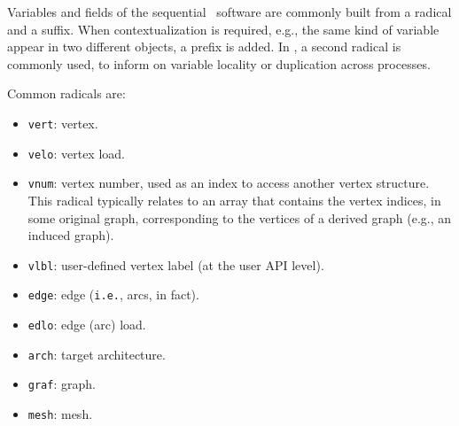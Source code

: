 Variables and fields of the sequential \scotch\ software are commonly
built from a radical and a suffix. When contextualization is required,
e.g., the same kind of variable appear in two different objects, a
prefix is added. In \ptscotch, a second radical is commonly used, to
inform on variable locality or duplication across processes.

Common radicals are:
\begin{itemize}
\item
\texttt{vert}: vertex.
\item
\texttt{velo}: vertex load.
\item
\texttt{vnum}: vertex number, used as an index to access another vertex
structure. This radical typically relates to an array that contains
the vertex indices, in some original graph, corresponding to the
vertices of a derived graph (e.g., an induced graph).
\item
\texttt{vlbl}: user-defined vertex label (at the user API level).
\item
\texttt{edge}: edge (\texttt{i.e.}, arcs, in fact).
\item
\texttt{edlo}: edge (arc) load.
\item
\texttt{arch}: target architecture.
\item
\texttt{graf}: graph.
\item
\texttt{mesh}: mesh.
\end{itemize}

